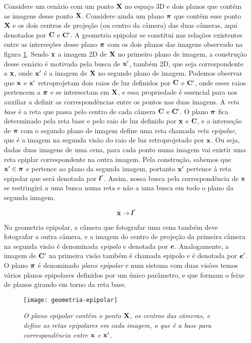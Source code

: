 Considere um cenário com um ponto $\mathbf{X}$ no espaço 3D e dois planos que contêm as imagens desse ponto $\mathbf{X}$. Considere ainda um plano $\boldsymbol{\pi}$ que contém esse ponto $\mathbf{X}$ e os dois centros de projeção (ou centro da câmera) das duas câmeras, aqui denotados por ${\bf C}$ e ${\bf C}'$. A geometria epipolar se constitui nas relações existentes entre as interseções desse plano $\boldsymbol{\pi}$ com os dois planos das imagens observado na figura \ref{fig.geo-epipolar}. Sendo $\mathbf{x}$ a imagem 2D de $\mathbf{X}$ no primeiro plano de imagem, a construção desse cenário é motivada pela busca de $\mathbf{x}'$, também 2D, que seja correspondente a $\mathbf{x}$, onde $\mathbf{x}'$ é a imagem de $\mathbf{X}$ no segundo plano de imagem. Podemos observar que $\mathbf{x}$ e $\mathbf{x}'$ retroprojetam dois raios de luz definidos por ${\bf C}$ e ${\bf C}'$, onde esses raios pertencem a $\boldsymbol{\pi}$ e se intersectam em $\mathbf{X}$, e essa propriedade é essencial para nos auxiliar a definir as correspondências entre os pontos nas duas imagens. A \textit{reta base} é a reta que passa pelo centro de cada câmera ${\bf C}$ e ${\bf C}'$. O plano $\boldsymbol{\pi}$ fica determinado pela reta base e pelo raio de luz definido por $\mathbf{x}$ e ${\bf C}$, e a interseção de $\boldsymbol{\pi}$ com o segundo plano de imagem define uma reta chamada \textit{reta epipolar}, que é a imagem na segunda visão do raio de luz retroprojetado por $\mathbf{x}$. Ou seja, dadas duas imagens de uma cena, para cada ponto numa imagem vai existir uma reta epiplar correspondente na outra imagem. Pela construção, sabemos que $\mathbf{x}'\in\boldsymbol{\pi}$ e pertence ao plano da segunda imagem, portanto $\mathbf{x}'$ pertence à reta epipolar que será denotada por $\boldsymbol{l}'$. Assim, nossa busca pela correspondência de $\mathbf{x}$ se restringirá a uma busca numa reta e não a uma busca em todo o plano da segunda imagem. 

\begin{equation*}
\mathbf{x}\rightarrow\boldsymbol{l}'
\end{equation*}

Na geometria epipolar, a câmera que fotografar uma cena também deve fotografar a outra câmera, e a imagem do centro de projeção da primeira câmera na segunda visão é denominada \textit{epipolo} e denotada por $\boldsymbol{e}$. Analogamente, a imagem de ${\bf C}'$ na primeira visão também é chamada epipolo e é denotada por $\boldsymbol{e}'$.
O plano $\boldsymbol{\pi}$ é denominado \textit{plano epipolar} e num sistema com duas visões temos vários planos epipolares definidos por um único parâmetro, e que formam o feixe de planos girando em torno da reta base.

\begin{figure}[!htb]
\centering
\texttt{[image: geometria-epipolar]}
\caption{\textit{O plano epipolar contém o ponto $\mathbf{X}$, os centros das câmeras, e define as retas epipolares em cada imagem, o que é a base para correspondência entre $\mathbf{x}$ e $\mathbf{x}'$.}}
\label{fig.geo-epipolar}
\end{figure}

